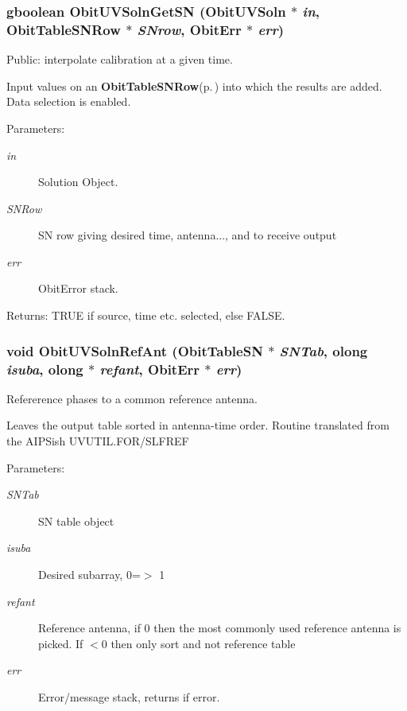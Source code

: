 \subsubsection{\setlength{\rightskip}{0pt plus 5cm}gboolean Obit\-UVSoln\-Get\-SN ({\bf Obit\-UVSoln} $\ast$ {\em in}, {\bf Obit\-Table\-SNRow} $\ast$ {\em SNrow}, {\bf Obit\-Err} $\ast$ {\em err})}\label{ObitUVSoln_8h_a24}


Public: interpolate calibration at a given time. 

Input values on an {\bf Obit\-Table\-SNRow}{\rm (p.\,\pageref{structObitTableSNRow})} into which the results are added. Data selection is enabled. \begin{Desc}
\item[Parameters:]
\begin{description}
\item[{\em in}]Solution Object. \item[{\em SNRow}]SN row giving desired time, antenna..., and to receive output \item[{\em err}]Obit\-Error stack. \end{description}
\end{Desc}
\begin{Desc}
\item[Returns:]TRUE if source, time etc. selected, else FALSE. \end{Desc}
\subsubsection{\setlength{\rightskip}{0pt plus 5cm}void Obit\-UVSoln\-Ref\-Ant ({\bf Obit\-Table\-SN} $\ast$ {\em SNTab}, {\bf olong} {\em isuba}, {\bf olong} $\ast$ {\em refant}, {\bf Obit\-Err} $\ast$ {\em err})}\label{ObitUVSoln_8h_a26}


Refererence phases to a common reference antenna. 

Leaves the output table sorted in antenna-time order. Routine translated from the AIPSish UVUTIL.FOR/SLFREF \begin{Desc}
\item[Parameters:]
\begin{description}
\item[{\em SNTab}]SN table object \item[{\em isuba}]Desired subarray, 0=$>$ 1 \item[{\em refant}]Reference antenna, if 0 then the most commonly used reference antenna is picked. If $<$0 then only sort and not reference table \item[{\em err}]Error/message stack, returns if error. \end{description}
\end{Desc}
